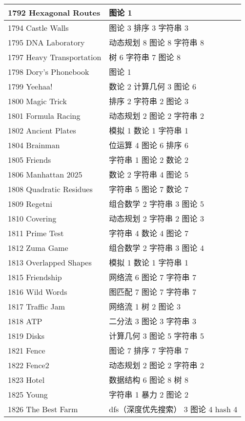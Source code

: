 \begin{longtable}{| p{} | p{} |}
 1792 Hexagonal Routes  & 图论 1 \\ \hline
 1794 Castle Walls  & 图论 3 排序 3 字符串 3 \\ \hline
 1795 DNA Laboratory  & 动态规划 8 图论 8 字符串 8 \\ \hline
 1797 Heavy Transportation  & 树 6 字符串 7 图论 8 \\ \hline
 1798 Dory's Phonebook  & 图论 1 \\ \hline
 1799 Yeehaa!  & 数论 2 计算几何 3 图论 6 \\ \hline
 1800 Magic Trick  & 排序 2 字符串 2 图论 3 \\ \hline
 1801 Formula Racing  & 动态规划 2 图论 2 字符串 2 \\ \hline
 1802 Ancient Plates  & 模拟 1 数论 1 字符串 1 \\ \hline
 1804 Brainman  & 位运算 4 图论 6 排序 6 \\ \hline
 1805 Friends  & 字符串 1 图论 2 数论 2 \\ \hline
 1806 Manhattan 2025  & 数论 2 字符串 4 图论 5 \\ \hline
 1808 Quadratic Residues  & 字符串 5 图论 7 数论 7 \\ \hline
 1809 Regetni  & 组合数学 2 字符串 3 图论 5 \\ \hline
 1810 Covering  & 动态规划 2 字符串 2 图论 3 \\ \hline
 1811 Prime Test  & 字符串 4 数论 4 图论 7 \\ \hline
 1812 Zuma Game  & 组合数学 2 字符串 3 图论 4 \\ \hline
 1813 Overlapped Shapes  & 模拟 1 数论 1 字符串 1 \\ \hline
 1815 Friendship  & 网络流 6 图论 7 字符串 7 \\ \hline
 1816 Wild Words  & 图匹配 7 图论 7 字符串 7 \\ \hline
 1817 Traffic Jam  & 网络流 1 树 2 图论 3 \\ \hline
 1818 ATP  & 二分法 3 图论 3 字符串 3 \\ \hline
 1819 Disks  & 计算几何 3 图论 5 字符串 5 \\ \hline
 1821 Fence  & 图论 7 排序 7 字符串 7 \\ \hline
 1822 Fence2  & 动态规划 2 图论 2 字符串 2 \\ \hline
 1823 Hotel  & 数据结构 6 图论 8 树 8 \\ \hline
 1825 Young  & 字符串 1 暴力 2 图论 2 \\ \hline
 1826 The Best Farm  & dfs（深度优先搜索） 3 图论 4 hash 4 \\ \hline

\end{longtable}
